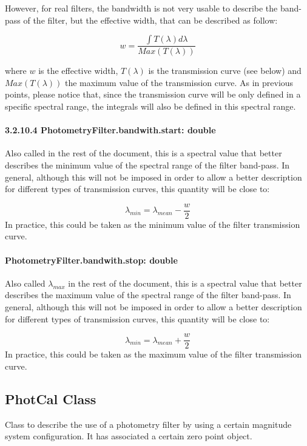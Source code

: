 \documentclass[11pt,a4paper]{ivoa}
\begin{document}
However, for real filters, the bandwidth is not very usable to describe the band-pass of the filter, but the effective width, that can be described as follow:
\par
\[
w = \frac{\int T(\lambda)d\lambda}{Max(T(\lambda))}
\]

where $w$ is the effective width, $T(\lambda)$ is the transmission curve (see below) and $Max(T(\lambda))$ the maximum value of the transmission curve. As in previous points, please notice that, since the transmission curve will be only defined in a specific spectral range, the integrals will also be defined in this spectral range.
\par

\paragraph{3.2.10.4
PhotometryFilter.bandwith.start: double }
Also called in the rest of the document, this is a spectral value that better describes the minimum value of the spectral range of the filter band-pass. In general, although this will not be imposed in order to allow a better description for different types of transmission curves, this quantity will be close to:
\par
\[
\lambda_{min} = \lambda_{mean} - \frac{w}{2}
\]
In practice, this could be taken as the minimum value of the filter transmission curve. 
\par

\paragraph{PhotometryFilter.bandwith.stop: double}
Also called $\lambda_{max}$ in the rest of the document, this is a spectral value that better describes the maximum value of the spectral range of the filter band-pass. In general, although this will not be imposed in order to allow a better description for different types of transmission curves, this quantity will be close to:
\par
\[
\lambda_{min} = \lambda_{mean} + \frac{w}{2}
\]
In practice, this could be taken as the maximum value of the filter transmission curve.\par

\subsection{PhotCal Class}
Class to describe the use of a photometry filter by using a certain magnitude system configuration. It has associated a certain zero point object.
\par
\end{document}
